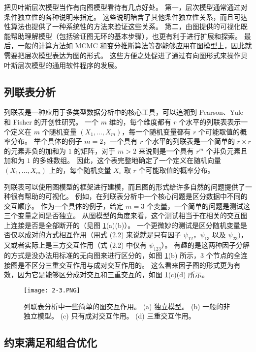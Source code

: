 把贝叶斯层次模型当作有向图模型看待有几点好处。
第一，层次模型通常通过对条件独立性的各种说明来指定。
这些说明暗含了其他条件独立性关系，而且可达性算法也提供了一种系统性的方法来验证这些关系。
第二，由图提供的可视化既能帮助理解模型（包括验证图无环的基本步骤），也更有利于进行扩展和探索。
最后，一般的计算方法如 MCMC 和变分推断算法等都能够应用在图模型上，因此就需要把层次模型表达为图的形式。
这些方便之处促进了通过有向图形式来操作贝叶斯层次模型的通用软件程序的发展。

\subsection{列联表分析}

列联表是一种应用于多类型数据分析中的核心工具，可以追溯到 Pearson、Yule 和 Fisher 的开创性研究。
一个 $m$ 维的，每个维度都有 $r$ 个水平的列联表表示一个定义在 $m$ 个随机变量 $(X_1, \dots, X_m)$，每一个随机变量都有 $r$ 个可能取值的概率分布。
举个具体的例子 $m = 2$，一个具有 $r$ 个水平的列联表是一个简单的 $r \times r$ 的元素非负的加和为 $1$ 的矩阵，对于 $m > 2$ 来说则是一个具有 $r^m$ 个非负元素且加和为 $1$ 的多维数组。
因此，这个表完整地确定了一个定义在随机向量 $(X_1, \dots, X_m)$ 上的，每个随机变量 $X_s$ 取 $r$ 个可能取值的概率分布。

列联表可以使用图模型的框架进行建模，而且图的形式给许多自然的问题提供了一种很有帮助的可视化。
例如，在列联表分析中一个核心问题是区分数据中不同的交互顺序。
作为一个具体的例子，给定 $m = 3$ 个变量，一个简单的问题是测试这三个变量之间是否独立。
从图模型的角度来看，这个测试相当于在相关的交互图上连接是否是全部断开的（见图 \ref{fig:2-3}(a)(b)）。
一个更微妙的测试是区分随机变量是否仅以成对的方式相互作用（用式 (2.2) 来说就是只有因子 $\psi_{12}$，$\psi_{13}$ 以及 $\psi_{23}$)，又或者实际上是三方交互作用（式 (2.2) 中仅有 $\psi_{123}$）。
有趣的是这两种因子分解的方式是没办法用标准的无向图来进行区分的，如图 \ref{fig:2-3}(b) 所示，3 个节点的全连接图是不区分三重交互作用与成对交互作用的。
这么看来因子图的形式更为有效，因为它是能够区分成对交互和三重交互的，如图 \ref{fig:2-3}(c)(d) 所示。

\begin{figure}[htbp]
    \centering
    \texttt{[image: 2-3.PNG]}
    \caption{
        列联表分析中一些简单的图交互作用。
        (a) 独立模型。
        (b) 一般的非独立模型。
        (c) 只有成对交互作用。
        (d) 三重交互作用。
    }\label{fig:2-3}
\end{figure}

\subsection{约束满足和组合优化}


